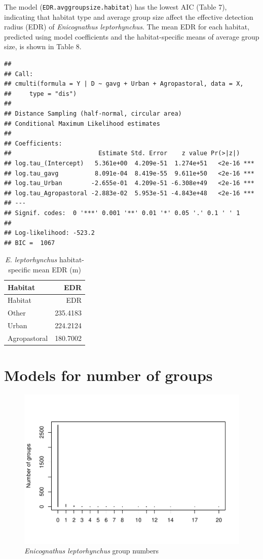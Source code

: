 \documentclass[]{article}
\begin{document}
The model (\texttt{EDR.avggroupsize.habitat}) has the lowest AIC (Table
7), indicating that habitat type and average group size affect the
effective detection radius (EDR) of \emph{Enicognathus leptorhynchus}.
The mean EDR for each habitat, predicted using model coefficients and
the habitat-specific means of average group size, is shown in Table 8.

\begin{verbatim}
## 
## Call:
## cmulti(formula = Y | D ~ gavg + Urban + Agropastoral, data = X, 
##     type = "dis")
## 
## Distance Sampling (half-normal, circular area)
## Conditional Maximum Likelihood estimates
## 
## Coefficients:
##                        Estimate Std. Error    z value Pr(>|z|)    
## log.tau_(Intercept)   5.361e+00  4.209e-51  1.274e+51   <2e-16 ***
## log.tau_gavg          8.091e-04  8.419e-55  9.611e+50   <2e-16 ***
## log.tau_Urban        -2.655e-01  4.209e-51 -6.308e+49   <2e-16 ***
## log.tau_Agropastoral -2.883e-02  5.953e-51 -4.843e+48   <2e-16 ***
## ---
## Signif. codes:  0 '***' 0.001 '**' 0.01 '*' 0.05 '.' 0.1 ' ' 1 
## 
## Log-likelihood: -523.2 
## BIC =  1067
\end{verbatim}

\begin{longtable}[]{@{}lr@{}}
\caption{\textit{E. leptorhynchus} habitat-specific mean EDR
(m)}\tabularnewline
\toprule
Habitat & EDR\tabularnewline
\midrule
\endfirsthead
\toprule
Habitat & EDR\tabularnewline
\midrule
\endhead
Other & 235.4183\tabularnewline
Urban & 224.2124\tabularnewline
Agropastoral & 180.7002\tabularnewline
\bottomrule
\end{longtable}

\section{Models for number of
groups}\label{models-for-number-of-groups-1}

\begin{figure}[H]
\includegraphics{Patagonia_parrots_density_analysis_files/figure-latex/unnamed-chunk-19-1} \caption{\textit{Enicognathus leptorhynchus} group numbers }\label{fig:unnamed-chunk-19}
\end{figure}
\end{document}
